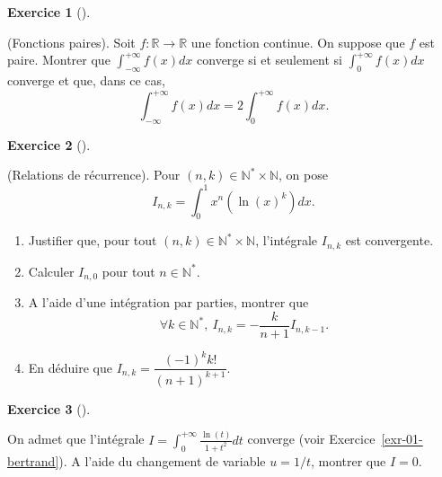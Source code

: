\documentclass[
  french,
  letterpaper,
  DIV=11,
  numbers=noendperiod]{scrreprt}
\theoremstyle{plain}
\theoremstyle{definition}
\theoremstyle{plain}
\theoremstyle{plain}
\theoremstyle{definition}
\newtheorem{exercise}{Exercice}[chapter]
\theoremstyle{definition}
\theoremstyle{plain}
\theoremstyle{remark}
\begin{document}
\begin{exercise}[]\protect\hypertarget{exr-01-0004}{}\label{exr-01-0004}

(Fonctions paires). Soit \(f:\mathbb{R}\to \mathbb{R}\) une fonction
continue. On suppose que \(f\) est paire. Montrer que
\(\int_{-\infty}^{+\infty}f(x)dx\) converge si et seulement si
\(\int_{0}^{+\infty}f(x)dx\) converge et que, dans ce cas,
\[\int_{-\infty}^{+\infty}f(x)dx = 2\int_{0}^{+\infty}f(x)dx.\]

\end{exercise}

\begin{exercise}[]\protect\hypertarget{exr-01-ipp-2}{}\label{exr-01-ipp-2}

(Relations de récurrence). Pour
\((n,k)\in\mathbb{N}^*\times\mathbb{N}\), on pose
\[\displaystyle I_{n,k} = \int_0^1x^n(\ln(x)^k)dx.\]

\begin{enumerate}
\def\labelenumi{\arabic{enumi}.}
\item
  Justifier que, pour tout \((n,k)\in\mathbb{N}^{*}\times\mathbb{N}\),
  l'intégrale \(I_{n,k}\) est convergente.
\item
  Calculer \(I_{n,0}\) pour tout \(n\in\mathbb{N}^{*}\).
\item
  A l'aide d'une intégration par parties, montrer que
  \[\forall k\in\mathbb{N}^*,\ I_{n,k} = -\frac{k}{n+1}I_{n,k-1}.\]
\item
  En déduire que \(I_{n,k} = \dfrac{(-1)^kk!}{(n+1)^{k+1}}\).
\end{enumerate}

\end{exercise}

\begin{exercise}[]\protect\hypertarget{exr-01-cht-var-1}{}\label{exr-01-cht-var-1}

On admet que l'intégrale \(I = \displaystyle
\int_0^{+\infty}\frac{\ln(t)}{1+t^2}dt\) converge (voir
Exercice~\ref{exr-01-bertrand}). A l'aide du changement de variable
\(u=1/t\), montrer que \(I=0\).

\end{exercise}
\end{document}
